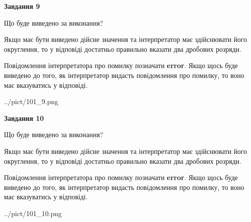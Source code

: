 \documentclass[12pt, ukrainian]{article}
\begin{document}
{\begin {Large}
{\begin {center}\textbf{Завдання 9}\end {center}}\par
Що буде виведено за виконання? \par

Якщо має бути виведено дійсне значення та інтерпретатор має здійснювати його округлення, 
то у відповіді достатньо правильно вказати два дробових розряди.

Повідомлення інтерпретатора про помилку позначати \textbf{error}.
Якщо щось буде виведено до того, як інтерпретатор видасть повідомлення про помилку, 
то воно має вказуватись у відповіді. \par

\begin{center}
	{../pict/101_9.png}
\end{center}
\newpage

{\begin {center}\textbf{Завдання 10}\end {center}}\par
Що буде виведено за виконання? \par

Якщо має бути виведено дійсне значення та інтерпретатор має здійснювати його округлення, 
то у відповіді достатньо правильно вказати два дробових розряди.

Повідомлення інтерпретатора про помилку позначати \textbf{error}.
Якщо щось буде виведено до того, як інтерпретатор видасть повідомлення про помилку, 
то воно має вказуватись у відповіді. \par

\begin{center}
	{../pict/101_10.png}
\end{center}
\newpage

\end {Large}}
\end{document}
